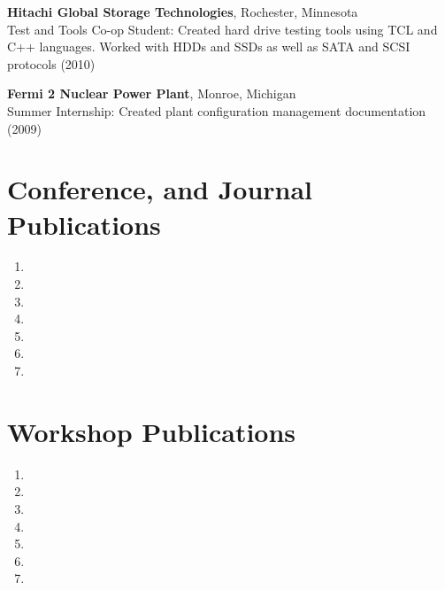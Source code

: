 \documentclass{article}
\begin{document}
{\bf Hitachi Global Storage Technologies}, Rochester, Minnesota \\
Test and Tools Co-op Student: Created hard drive testing tools using TCL and
C++ languages. Worked with HDDs and SSDs as well as SATA and SCSI protocols (2010)

{\bf Fermi 2 Nuclear Power Plant}, Monroe, Michigan \\
Summer Internship: Created plant configuration management documentation (2009)


\section*{Conference, and Journal Publications}
\vspace{-6pt}
\begin{enumerate}
  \item {}
  \item {}
  \item {}
  \item {}
  \item {}
  \item {}
  \item {}
\end{enumerate}

\section*{Workshop Publications}
\vspace{-6pt}
\begin{enumerate}
  \item {}
  \item {}
  \item {}
  \item {}
  \item {}
  \item {}
  \item {}
\end{enumerate}
\end{document}
